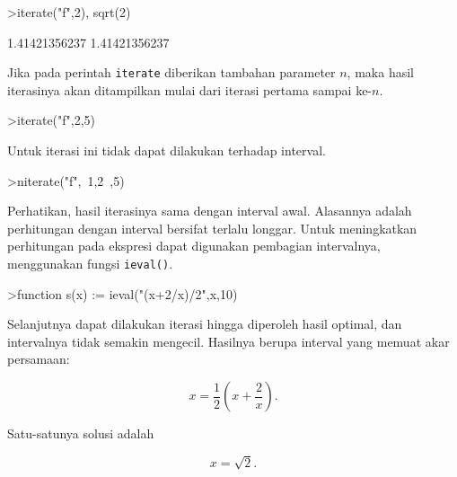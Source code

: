 \documentclass[a4paper,11pt,oneside,enabledeprecatedfontcommands]{scrbook}
\newenvironment{eulernotebook}{}{}
\newenvironment{eulercomment}{\par\medskip\noindent}{\par\medskip}
\newenvironment{eulerformula}{}{}
\begin{document}
\begin{eulernotebook}
\begin{eulerprompt}
>iterate("f",2), sqrt(2)
\end{eulerprompt}
\begin{euleroutput}
  1.41421356237
  1.41421356237
\end{euleroutput}
\begin{eulercomment}
Jika pada perintah \texttt{iterate} diberikan tambahan parameter $n$, maka hasil iterasinya akan ditampilkan mulai dari iterasi pertama sampai ke-$n$.
\end{eulercomment}
\begin{eulerprompt}
>iterate("f",2,5)
\end{eulerprompt}
\begin{euleroutput}
  [2,  1.5,  1.41667,  1.41422,  1.41421,  1.41421]
\end{euleroutput}
\begin{eulercomment}
Untuk iterasi ini tidak dapat dilakukan terhadap interval.
\end{eulercomment}
\begin{eulerprompt}
>niterate("f",~1,2~,5)
\end{eulerprompt}
\begin{euleroutput}
  [ ~1,2~,  ~1,2~,  ~1,2~,  ~1,2~,  ~1,2~,  ~1,2~ ]
\end{euleroutput}
\begin{eulercomment}
Perhatikan, hasil iterasinya sama dengan interval awal. Alasannya adalah perhitungan dengan interval bersifat terlalu longgar. Untuk meningkatkan perhitungan pada ekspresi dapat digunakan pembagian intervalnya, menggunakan fungsi \texttt{ieval()}.
\end{eulercomment}
\begin{eulerprompt}
>function s(x) := ieval("(x+2/x)/2",x,10)
\end{eulerprompt}
\begin{eulercomment}
Selanjutnya dapat dilakukan iterasi hingga diperoleh hasil optimal, dan intervalnya tidak semakin mengecil. Hasilnya berupa interval yang memuat akar persamaan:
\end{eulercomment}
\begin{eulerformula}
\[
x = \frac{1}{2} \left( x + \frac{2}{x} \right).
\]
\end{eulerformula}
\begin{eulercomment}
Satu-satunya solusi adalah
\end{eulercomment}
\begin{eulerformula}
\[
x = \sqrt{2}.
\]
\end{eulerformula}

\end{eulernotebook}
\end{document}
